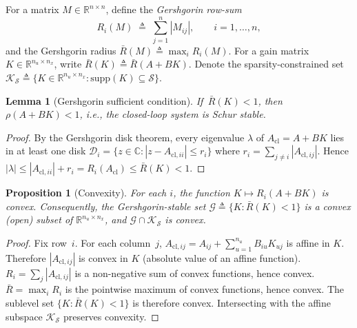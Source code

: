 \documentclass[conference]{IEEEtran}
\newtheorem{lemma}{Lemma}
\newtheorem{proposition}{Proposition}
\begin{document}
For a matrix $M\in\mathbb{R}^{n\times n}$, define the
\emph{Gershgorin row-sum}
\begin{equation}\label{eq:Ri}
  R_i(M) \;\triangleq\; \sum_{j=1}^{n} |M_{ij}|, \qquad i=1,\dots,n,
\end{equation}
and the Gershgorin radius
$\bar{R}(M)\triangleq \max_{i} R_i(M)$.
For a gain matrix $K\in\mathbb{R}^{n_u\times n_x}$, write
$\bar{R}(K)\triangleq \bar{R}(A+BK)$.
Denote the sparsity-constrained set
$\mathcal{K}_{\mathcal{S}}\triangleq\{K\in\mathbb{R}^{n_u\times n_x}:
\mathrm{supp}(K)\subseteq\mathcal{S}\}$.

\begin{lemma}[Gershgorin sufficient condition]\label{lem:gers}
If\, $\bar{R}(K)<1$, then $\rho(A+BK)<1$, i.e., the closed-loop
system is Schur stable.
\end{lemma}
\begin{proof}
By the Gershgorin disk theorem, every eigenvalue $\lambda$ of
$A_{\mathrm{cl}}=A+BK$ lies in at least one disk
$\mathcal{D}_i=\{z\in\mathbb{C}:|z-A_{\mathrm{cl},ii}|\le r_i\}$
where $r_i=\sum_{j\neq i}|A_{\mathrm{cl},ij}|$.  Hence
$|\lambda|\le |A_{\mathrm{cl},ii}|+r_i = R_i(A_{\mathrm{cl}})
\le \bar{R}(K)< 1$.
\end{proof}

\begin{proposition}[Convexity]\label{prop:convex}
For each $i$, the function $K\mapsto R_i(A+BK)$ is convex.
Consequently, the Gershgorin-stable set
$\mathcal{G}\triangleq\{K:\bar{R}(K)<1\}$ is a convex (open) subset
of\/ $\mathbb{R}^{n_u\times n_x}$, and
$\mathcal{G}\cap\mathcal{K}_{\mathcal{S}}$ is convex.
\end{proposition}
\begin{proof}
Fix row~$i$.  For each column~$j$,
$A_{\mathrm{cl},ij}=A_{ij}+\sum_{u=1}^{n_u}B_{iu}K_{uj}$ is affine
in $K$.  Therefore $|A_{\mathrm{cl},ij}|$ is convex in $K$ (absolute
value of an affine function).  $R_i=\sum_j|A_{\mathrm{cl},ij}|$ is a
non-negative sum of convex functions, hence convex.
$\bar{R}=\max_i R_i$ is the pointwise maximum of convex functions,
hence convex.  The sublevel set $\{K:\bar{R}(K)<1\}$ is therefore
convex.  Intersecting with the affine subspace
$\mathcal{K}_{\mathcal{S}}$ preserves convexity.
\end{proof}

\end{document}
